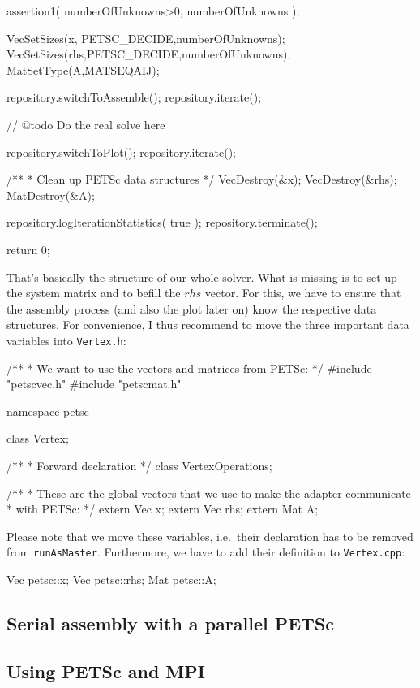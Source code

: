 \begin{code}
{  assertion1( numberOfUnknowns>0, numberOfUnknowns );

  VecSetSizes(x,  PETSC_DECIDE,numberOfUnknowns);
  VecSetSizes(rhs,PETSC_DECIDE,numberOfUnknowns);
  MatSetType(A,MATSEQAIJ);
  
  repository.switchToAssemble(); repository.iterate();

  // @todo Do the real solve here

  repository.switchToPlot(); repository.iterate();


  /**
   * Clean up PETSc data structures
   */
  VecDestroy(&x);
  VecDestroy(&rhs);
  MatDestroy(&A);

  repository.logIterationStatistics( true );
  repository.terminate();

  return 0;
}
\end{code}

\noindent
That's basically the structure of our whole solver.
What is missing is to set up the system matrix and to befill the $rhs$ vector.
For this, we have to ensure that the assembly process (and also the plot later
on) know the respective data structures.
For convenience, I thus recommend to move the three important data variables
into \texttt{Vertex.h}:

\begin{code}
/**
 * We want to use the vectors and matrices from PETSc:
 */
#include "petscvec.h"
#include "petscmat.h"


namespace petsc { 
  class Vertex;
      
  /**
   * Forward declaration
   */
  class VertexOperations;

  /**
   * These are the global vectors that we use to make the adapter communicate
   * with PETSc:
   */
  extern Vec  x;
  extern Vec  rhs;
  extern Mat  A;
}
\end{code}

\noindent
Please note that we move these variables, i.e.~their declaration has to be
removed from \texttt{runAsMaster}. Furthermore, we have to add their definition
to \texttt{Vertex.cpp}:

\begin{code}
Vec  petsc::x;
Vec  petsc::rhs;
Mat  petsc::A;
\end{code}



\subsection{Serial assembly with a parallel PETSc}


\subsection{Using PETSc and MPI}

